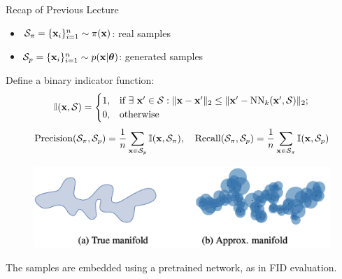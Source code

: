 \documentclass{beamer}
\begin{document}
\begin{frame}{Recap of Previous Lecture}
	\vspace{-0.2cm}
	\begin{itemize}
		\item $\mathcal{S}_{\pi} = \{\mathbf{x}_i\}_{i=1}^{n} \sim \pi(\mathbf{x})$: real samples
		\item $\mathcal{S}_{p} = \{\mathbf{x}_i\}_{i=1}^{n} \sim p(\mathbf{x} | \boldsymbol{\theta})$: generated samples
	\end{itemize}
	Define a binary indicator function:
	\vspace{-0.2cm}
	\[
		\mathbb{I}(\mathbf{x}, \mathcal{S}) = 
		\begin{cases}
			1, & \text{if}~ \exists~ \mathbf{x}' \in \mathcal{S}: \| \mathbf{x}  - \mathbf{x}'\|_2 \leq \| \mathbf{x}' - \text{NN}_k(\mathbf{x}', \mathcal{S})\|_2; \\
			0, & \text{otherwise}
		\end{cases}
	\]
	\vspace{-0.3cm}
	\[
		\text{Precision} (\mathcal{S}_{\pi}, \mathcal{S}_{p}) = \frac{1}{n} \sum_{\mathbf{x} \in \mathcal{S}_{p}} \mathbb{I}(\mathbf{x}, \mathcal{S}_{\pi}),
		\quad
		\text{Recall} (\mathcal{S}_{\pi}, \mathcal{S}_{p}) = \frac{1}{n} \sum_{\mathbf{x} \in \mathcal{S}_{\pi}} \mathbb{I}(\mathbf{x}, \mathcal{S}_{p})
	\]
	\vspace{-0.7cm}
	\begin{figure}
		\includegraphics[width=0.75\linewidth]{figs/pr_k_nearest}
	\end{figure}
	\vspace{-0.3cm}
	The samples are embedded using a pretrained network, as in FID evaluation.
\end{frame}
\end{document}
